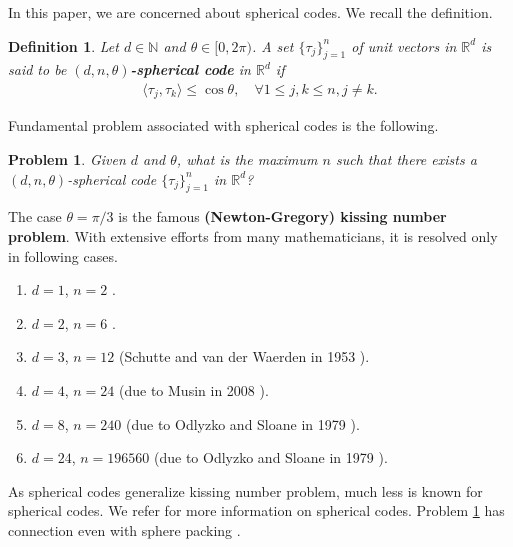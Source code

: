 \documentclass{amsart}
\newtheorem{definition}[theorem]{Definition}
\newtheorem{problem}[theorem]{Problem}
\begin{document}
In this paper, we are concerned about spherical codes. We recall the definition. 
\begin{definition}\cite{ZONG}
 Let $d\in \mathbb{N}$ and $\theta \in [0, 2\pi)$. A set $\{\tau_j\}_{j=1}^n$  of unit vectors  in $\mathbb{R}^d$	is said to be \textbf{$(d,n,\theta )$-spherical code} in $\mathbb{R}^d$ if 
\begin{align*}
	\langle \tau_j, \tau_k\rangle\leq \cos \theta , \quad \forall 1\leq j, k \leq n, j \neq k.
\end{align*}		
\end{definition}
 Fundamental problem associated with spherical codes is the following.
 \begin{problem}\label{SCP}
 	Given $d$ and $\theta$, what is the maximum $n$ such that there exists a $(d,n,\theta )$-spherical code $\{\tau_j\}_{j=1}^n$  in $\mathbb{R}^d$?
 \end{problem}
 The case $\theta=\pi/3$ is the famous \textbf{(Newton-Gregory) kissing number problem}. With extensive efforts from many mathematicians, it is  resolved only in following cases.
 \begin{enumerate}[\upshape(i)]
 	\item $d=1$, $n=2$ \cite{PFENDERZIEGLER}.
 	\item $d=2$, $n=6$ \cite{PFENDERZIEGLER}.
 	\item $d=3$, $n=12$ (Schutte and van der Waerden in 1953 \cite{SCHUTTEVANDER}). 
 	\item $d=4$, $n=24$ (due to Musin in 2008 \cite{MUSIN}).
 	\item  $d=8$, $n=240$ (due to Odlyzko and Sloane  in  1979 \cite{ODLYZKOSLOANE}).
 	\item 	 $d=24$, $n=196560$ (due to Odlyzko and Sloane in 1979 \cite{ODLYZKOSLOANE}).
 \end{enumerate}
 As spherical codes generalize kissing number problem, much less is known for spherical codes. We refer \cite{DELSARTEGOETHALSSEIDEL, ERICSONZINOVIEV, CONWAYSLOANE, COHNJIAOKUMARTORQUATO, BANNAIBANNAI, BACHOCVALLENTIN, JENSSENJOOSPERKINS, SARDARIZARGAR} for more information on spherical codes.
 Problem \ref{SCP} has connection even with sphere packing  \cite{COHNZHAO}. 
 
\end{document}

